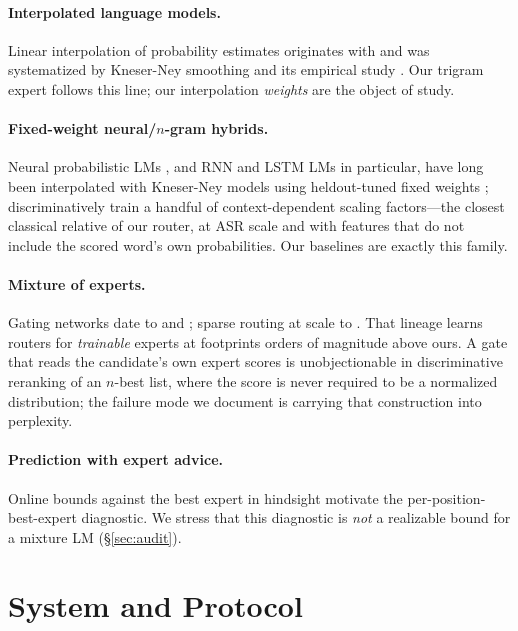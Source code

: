 \documentclass[11pt]{article}
\begin{document}
\paragraph{Interpolated language models.} Linear interpolation of probability
estimates originates with \citet{jelinek1980} and was systematized by Kneser-Ney
smoothing \cite{kneser1995} and its empirical study \cite{chen1999}. Our
trigram expert follows this line; our interpolation \emph{weights} are the
object of study.

\paragraph{Fixed-weight neural/$n$-gram hybrids.} Neural probabilistic LMs
\cite{bengio2003}, and RNN and LSTM LMs in particular, have long been
interpolated with Kneser-Ney models using heldout-tuned fixed weights
\cite{mikolov2010,mikolov2011,sundermeyer2012}; \citet{chang2015} discriminatively train a
handful of context-dependent scaling factors---the closest classical relative
of our router, at ASR scale and with features that do not include the scored
word's own probabilities. Our baselines are exactly this family.

\paragraph{Mixture of experts.} Gating networks date to \citet{jacobs1991} and
\citet{jordan1994}; sparse routing at scale to \citet{shazeer2017}. That
lineage learns routers for \emph{trainable} experts at footprints orders of
magnitude above ours. A gate that reads the candidate's own expert scores is
unobjectionable in discriminative reranking of an $n$-best list, where the score
is never required to be a normalized distribution; the failure mode we document
is carrying that construction into perplexity.

\paragraph{Prediction with expert advice.} Online bounds against the best
expert in hindsight \cite{freund1997,cesabianchi2006} motivate the
per-position-best-expert diagnostic. We stress that this diagnostic is
\emph{not} a realizable bound for a mixture LM (\S\ref{sec:audit}).

\section{System and Protocol}
\label{sec:system}
\end{document}

